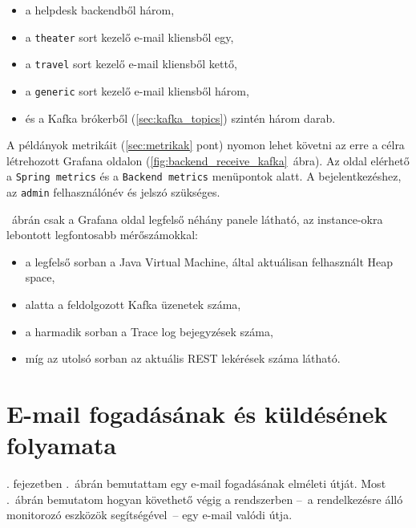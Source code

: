 \begin{itemize}
	\item a helpdesk backendből három,
	\item a \texttt{theater} sort kezelő e-mail kliensből egy,
	\item a \texttt{travel} sort kezelő e-mail kliensből kettő,
	\item a \texttt{generic} sort kezelő e-mail kliensből három,
	\item és a Kafka brókerből (\ref{sec:kafka_topics}) szintén három darab.
\end{itemize}

A példányok metrikáit (\ref{sec:metrikak} pont) nyomon lehet követni az erre a célra létrehozott Grafana oldalon (\ref{fig:backend_receive_kafka}~ábra). Az oldal elérhető a  \texttt{Spring metrics} és a \texttt{Backend metrics} menüpontok alatt. A bejelentkezéshez, az \texttt{admin} felhasználónév és jelszó szükséges.

~ábrán csak a Grafana oldal legfelső néhány panele látható, az instance-okra lebontott legfontosabb mérőszámokkal:

\begin{itemize}
	\item a legfelső sorban a Java Virtual Machine, által aktuálisan felhasznált Heap space,	
	\item alatta a feldolgozott Kafka üzenetek száma,
	\item a harmadik sorban a Trace log bejegyzések száma,
	\item míg az utolsó sorban az aktuális REST lekérések száma látható.
\end{itemize}



\section{E-mail fogadásának és küldésének folyamata}
. fejezetben .~ábrán bemutattam egy e-mail fogadásának elméleti útját. Most .~ábrán bemutatom hogyan követhető végig a rendszerben --~a rendelkezésre álló monitorozó eszközök segítségével~-- egy e-mail valódi útja.


